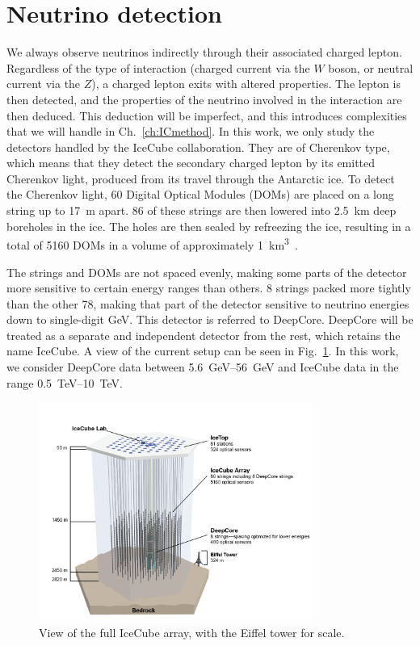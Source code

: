 \section{Neutrino detection}
We always observe neutrinos indirectly through their associated charged lepton. 
Regardless of the type of interaction (charged current via the $W$ boson, or neutral current
via the $Z$), a charged lepton exits with altered properties. The lepton is then detected, and the properties of the neutrino involved in the 
interaction are then deduced. This deduction will be imperfect, and this introduces complexities that we will handle in Ch.~\ref{ch:ICmethod}. 
In this work, we only study the detectors handled by the IceCube collaboration. They are of Cherenkov type, which means that they detect 
the secondary charged lepton by its emitted Cherenkov light, produced from its travel through the Antarctic ice. 
To detect the Cherenkov light, 60 Digital Optical Modules (DOMs) are placed on a long string up to \SI{17}{\metre} apart. 86 of these strings are then lowered
into \SI{2.5}{\km} deep boreholes in the ice. The holes are then sealed by refreezing the ice, resulting in a total of 5160 DOMs in a volume of approximately \SI{1}{\km^3}~\cite{weaverThesis}.

The strings and DOMs are not spaced evenly, making some parts of the detector more sensitive to certain energy ranges than others.
8 strings packed more tightly than the other 78, making that part of the detector sensitive to neutrino energies down to single-digit \si{\GeV}. This detector is referred to DeepCore. DeepCore will be treated as a separate and independent detector from the rest, which
retains the name IceCube. A view of the current setup can be seen in Fig.~\ref{fig:array}. In this work, we consider DeepCore data between \SIrange{5.6}{56}{\GeV} and IceCube data in the range \SIrange{0.5}{10}{\TeV}.
\begin{figure}
    \centering
    \includegraphics[width=0.8\textwidth]{figures/icecube2.png}
    \caption{View of the full IceCube array, with the Eiffel tower for scale.}\label{fig:array}
\end{figure}

